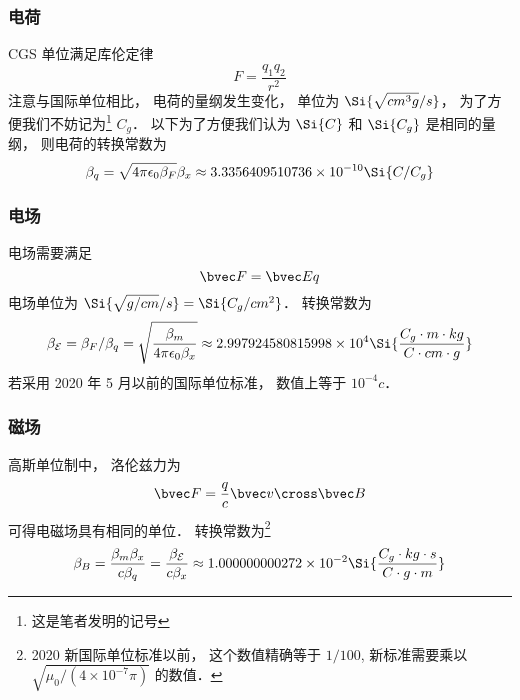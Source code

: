 

\subsubsection{电荷}
CGS 单位满足库伦定律
\begin{equation}\label{GaussU_eq1}
F = \frac{q_1 q_2}{r^2}
\end{equation}
注意与国际单位相比， 电荷的量纲发生变化， 单位为 $\Si{\sqrt{cm^3 g}/s}$， 为了方便我们不妨记为\footnote{这是笔者发明的记号} $C_g$． 以下为了方便我们认为 $\Si{C}$ 和 $\Si{C_g}$ 是相同的量纲， 则电荷的转换常数为
\begin{equation}
\beta_q = \sqrt{4\pi\epsilon_0\beta_F} \beta_x \approx 3.3356409510736\times 10^{-10} \Si{C/C_g}
\end{equation}

\subsubsection{电场}
电场需要满足
\begin{equation}
\bvec F = \bvec E q
\end{equation}
电场单位为 $\Si{\sqrt{g/cm}/s} = \Si{C_g/cm^2}$． 转换常数为
\begin{equation}
\beta_{\mathcal E} = \beta_F/\beta_q = \sqrt{\frac{\beta_m}{4\pi\epsilon_0 \beta_x}} \approx 2.997924580815998\times 10^4 \Si{\frac{C_g\cdot m\cdot kg}{C\cdot cm\cdot g}}
\end{equation}
若采用 2020 年 5 月以前的国际单位标准， 数值上等于 $10^{-4} c$．

\subsubsection{磁场}
高斯单位制中， 洛伦兹力为
\begin{equation}
\bvec F = \frac{q}{c} \bvec v \cross \bvec B
\end{equation}
可得电磁场具有相同的单位． 转换常数为\footnote{2020 新国际单位标准以前， 这个数值精确等于 $1/100$, 新标准需要乘以 $\sqrt{\mu_0/(4\times 10^{-7}\pi)}$ 的数值．}
\begin{equation}
\beta_B = \frac{\beta_m\beta_x}{c\beta_q} = \frac{\beta_{\mathcal E}}{c\beta_x} \approx 1.000000000272\times 10^{-2} \Si{\frac{C_g\cdot kg \cdot s}{C \cdot g \cdot m}}
\end{equation}

